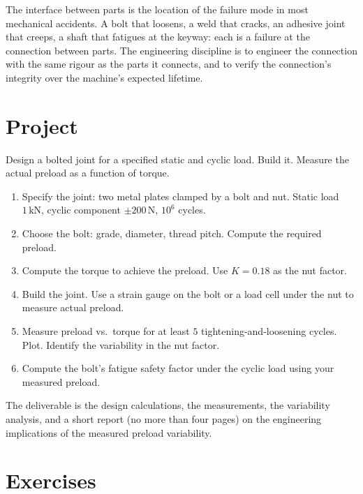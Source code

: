 \begin{principle}
The interface between parts is the location of the failure mode in most mechanical accidents. A bolt that loosens, a weld that cracks, an adhesive joint that creeps, a shaft that fatigues at the keyway: each is a failure at the connection between parts. The engineering discipline is to engineer the connection with the same rigour as the parts it connects, and to verify the connection's integrity over the machine's expected lifetime.
\end{principle}

\section{Project}

\begin{project}
Design a bolted joint for a specified static and cyclic load. Build it. Measure the actual preload as a function of torque.

\begin{enumerate}[leftmargin=*]
  \item Specify the joint: two metal plates clamped by a bolt and nut. Static load $1\,\si{\kilo\newton}$, cyclic component $\pm 200\,\si{\newton}$, $10^6$ cycles.
  \item Choose the bolt: grade, diameter, thread pitch. Compute the required preload.
  \item Compute the torque to achieve the preload. Use $K = 0.18$ as the nut factor.
  \item Build the joint. Use a strain gauge on the bolt or a load cell under the nut to measure actual preload.
  \item Measure preload vs.\ torque for at least $5$ tightening-and-loosening cycles. Plot. Identify the variability in the nut factor.
  \item Compute the bolt's fatigue safety factor under the cyclic load using your measured preload.
\end{enumerate}

The deliverable is the design calculations, the measurements, the variability analysis, and a short report (no more than four pages) on the engineering implications of the measured preload variability.
\end{project}

\section{Exercises}

